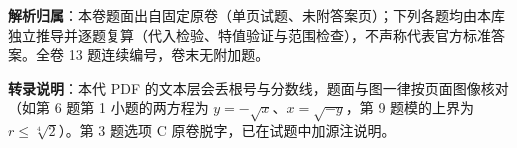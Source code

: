 

\begin{gknotice}
\textbf{解析归属}：本卷题面出自固定原卷（单页试题、未附答案页）；下列各题均由本库独立推导并逐题复算（代入检验、特值验证与范围检查），不声称代表官方标准答案。全卷 13 题连续编号，卷末无附加题。

\textbf{转录说明}：本代 PDF 的文本层会丢根号与分数线，题面与图一律按页面图像核对（如第 6 题第 1 小题的两方程为 $y=-\sqrt{x}$、$x=\sqrt{-y}$，第 9 题模的上界为 $r\leqslant\sqrt[4]{2}$）。第 3 题选项 C 原卷脱字，已在试题中加源注说明。
\end{gknotice}

